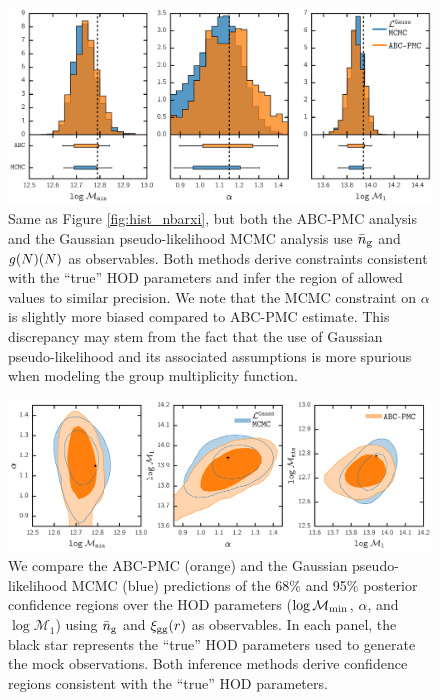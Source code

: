 \begin{figure}
\includegraphics[width=1.\textwidth]{figures/abc/paper_ABCvsMCMC_nbargmf.pdf}
\caption{\label{fig:hist_nbargmf} 
Same as Figure \ref{fig:hist_nbarxi}, but both the ABC-PMC
analysis and the Gaussian pseudo-likelihood MCMC analysis use $\bar{n}_{\mathrm{g}}$ and $g(N)(N)$ as 
observables. Both methods derive constraints consistent with the ``true'' HOD parameters 
and infer the region of allowed values to similar precision. We note that the MCMC constraint 
on $\alpha$ is slightly more biased compared to ABC-PMC estimate. This discrepancy may stem 
from the fact that the use of Gaussian pseudo-likelihood and its associated assumptions is more 
spurious when modeling the group multiplicity function.}
\end{figure}

\begin{figure}
\includegraphics[width=1.\textwidth]{figures/abc/paper_ABCvsMCMC_contour_nbarxi.pdf}
\caption{\label{fig:cont_nbarxi}
We compare the ABC-PMC (orange) and the Gaussian pseudo-likelihood MCMC (blue)
predictions of the 68\% and 95\% posterior confidence regions over the HOD 
parameters ($\log \mathcal{M}_{\rm min}$, $\alpha$, and $\log \mathcal{M}_{1}$) 
using $\bar{n}_{\mathrm{g}}$ and $\xi_{\mathrm{gg}}(r)$ as observables. In each panel, the black star
represents the ``true'' HOD parameters used to generate the mock observations. 
Both inference methods derive confidence regions consistent with the ``true'' 
HOD parameters.}
\end{figure}

